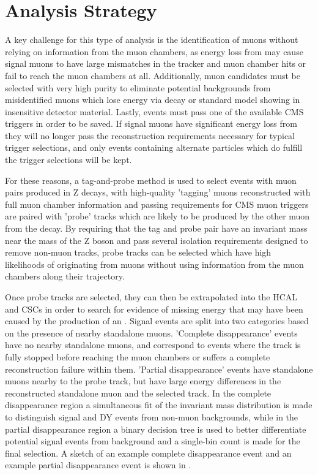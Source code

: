\chapter{Analysis Strategy}
\label{analysis}
A key challenge for this type of analysis is the identification of muons without relying on information from the muon chambers, as energy loss from \dbrem may cause signal muons to have large mismatches in the tracker and muon chamber hits or fail to reach the muon chambers at all.
Additionally, muon candidates must be selected with very high purity to eliminate potential backgrounds from misidentified muons which lose energy via decay or standard model showing in insensitive detector material.
Lastly, events must pass one of the available CMS triggers in order to be saved.
If signal muons have significant energy loss from \dbrem they will no longer pass the reconstruction requirements necessary for typical trigger selections, and only events containing alternate particles which do fulfill the trigger selections will be kept.

For these reasons, a tag-and-probe method is used to select events with muon pairs produced in Z decays, with high-quality 'tagging' muons reconstructed with full muon chamber information and passing requirements for CMS muon triggers are paired with 'probe' tracks which are likely to be produced by the other muon from the decay.
By requiring that the tag and probe pair have an invariant mass near the mass of the Z boson and pass several isolation requirements designed to remove non-muon tracks, probe tracks can be selected which have high likelihoods of originating from muons without using information from the muon chambers along their trajectory.

Once probe tracks are selected, they can then be extrapolated into the HCAL and CSCs in order to search for evidence of missing energy that may have been caused by the production of an \aprime.
Signal events are split into two categories based on the presence of nearby standalone muons.
'Complete disappearance' events have no nearby standalone muons, and correspond to events where the track is fully stopped before reaching the muon chambers or suffers a complete reconstruction failure within them.
'Partial disappearance' events have standalone muons nearby to the probe track, but have large energy differences in the reconstructed standalone muon and the selected track.
In the complete disappearance region a simultaneous fit of the invariant mass distribution is made to distinguish signal and DY events from non-muon backgrounds, while in the partial disappearance region a binary decision tree is used to better differentiate potential signal events from background and a single-bin count is made for the final selection.
A sketch of an example complete disappearance event and an example partial disappearance event is shown in .

